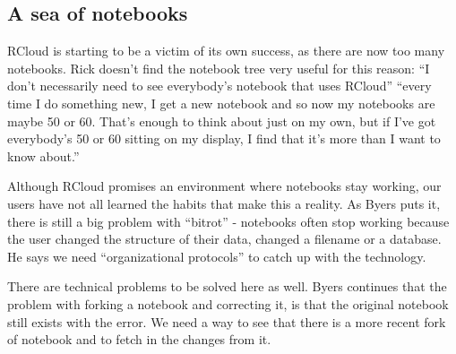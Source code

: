 




\subsection{A sea of notebooks}
RCloud is starting to be a victim of its own success, as there are now too many
notebooks.  Rick doesn't find the notebook tree very useful for this reason: ``I
don't necessarily need to see everybody's notebook that uses RCloud'' ``every
time I do something new, I get a new notebook and so now my notebooks are maybe
50 or 60. That's enough to think about just on my own, but if I've got
everybody's 50 or 60 sitting on my display, I find that it's more than I want to
know about.''

Although RCloud promises an environment where notebooks stay working, our users
have not all learned the habits that make this a reality. As Byers puts it,
there is still a big problem with ``bitrot'' - notebooks often stop working
because the user changed the structure of their data, changed a filename or a
database.  He says we need ``organizational protocols'' to catch up with the
technology.

There are technical problems to be solved here as well. Byers continues that the
problem with forking a notebook and correcting it, is that the original notebook
still exists with the error.  We need a way to see that there is a more recent
fork of notebook and to fetch in the changes from it.

